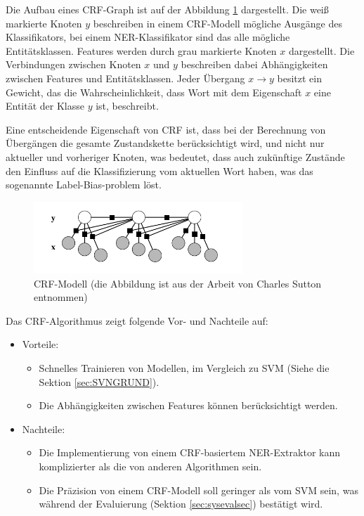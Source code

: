 Die Aufbau eines CRF-Graph ist auf der Abbildung \ref{fig:CRF-Modell} dargestellt. Die weiß markierte Knoten $y$ beschreiben in einem CRF-Modell mögliche Ausgänge des Klassifikators, bei einem NER-Klassifikator sind das alle mögliche Entitätsklassen. Features werden durch grau markierte Knoten $x$ dargestellt. Die Verbindungen zwischen Knoten $x$ und $y$ beschreiben dabei Abhängigkeiten zwischen Features und Entitätsklassen. Jeder Übergang $x \longrightarrow y$ besitzt ein Gewicht, das die Wahrscheinlichkeit, dass Wort mit dem Eigenschaft $x$ eine Entität der Klasse $y$ ist, beschreibt.

Eine entscheidende Eigenschaft von CRF ist, dass bei der Berechnung von Übergängen die gesamte Zustandskette berücksichtigt wird, und nicht nur aktueller und vorheriger Knoten\cite{rossler2007korpus}, was bedeutet, dass auch zukünftige Zustände den Einfluss auf die Klassifizierung vom aktuellen Wort haben, was das sogenannte Label-Bias-problem\cite{lafferty2001conditional} löst.

\begin{figure}[ht]
\vbox{\small}
\includegraphics[width=0.7\textwidth]{Bilder/crf-modell-charles-andrew}
\caption{CRF-Modell (die Abbildung ist aus der Arbeit von Charles Sutton \cite{Charles/Andrew:10} entnommen)}
\label{fig:CRF-Modell}
\end{figure}

Das CRF-Algorithmus zeigt folgende Vor- und Nachteile auf:
\begin{itemize}
\item Vorteile:
\begin{itemize}
\item Schnelles Trainieren von Modellen\cite{sha2003shallow}, im Vergleich zu SVM (Siehe die Sektion \ref{sec:SVNGRUND}).
\item Die Abhängigkeiten zwischen Features können berücksichtigt werden.
\end{itemize}
\item Nachteile:
\begin{itemize}
\item Die Implementierung von einem CRF-basiertem NER-Extraktor kann komplizierter als die von anderen Algorithmen sein.
\item Die Präzision von einem CRF-Modell soll geringer als vom SVM sein, was während der Evaluierung (Sektion \ref{sec:sysevalsec}) bestätigt wird.
\end{itemize}
\end{itemize}

